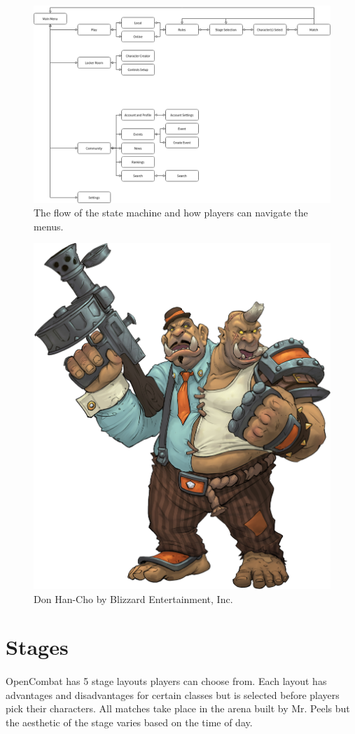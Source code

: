 \pagebreak

\begin{figure}[h!]
    \centering
    \includegraphics[width=1\linewidth]{images/flow-menu.png}
    \caption{The flow of the state machine and how players can navigate the menus.}
\end{figure}

\begin{figure}[h!]
    \centering
    \includegraphics[width=0.3\linewidth]{images/characters-balance.png}
    \caption{Don Han-Cho by Blizzard Entertainment, Inc.\nocite{blizzard_entertainment_inc_don_2016}}
\end{figure}

\pagebreak

\section{Stages}

\paragraph{} OpenCombat has 5 stage layouts players can choose from. Each layout has advantages and disadvantages for certain classes but is selected before players pick their characters. All matches take place in the arena built by Mr. Peels but the aesthetic of the stage varies based on the time of day.

